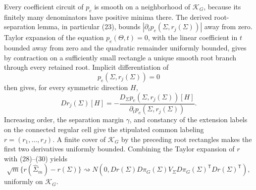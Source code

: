 Every coefficient circuit of \(p_e\) is smooth on a neighborhood of \(\mathcal K_G\), because its finitely many denominators have positive minima there.  The derived root-separation lemma, in particular (23), bounds \(|\partial_t p_e(\Sigma,r_j(\Sigma))|\) away from zero.  Taylor expansion of the equation \(p_e(\Theta,t)=0\), with the linear coefficient in \(t\) bounded away from zero and the quadratic remainder uniformly bounded, gives by contraction on a sufficiently small rectangle a unique smooth root branch through every retained root.  Implicit differentiation of
\[
 p_e(\Sigma,r_j(\Sigma))=0
\]
then gives, for every symmetric direction \(H\),
\[
 Dr_j(\Sigma)[H]
 =-\frac{D_\Sigma p_e(\Sigma,r_j(\Sigma))[H]}
         {\partial_t p_e(\Sigma,r_j(\Sigma))}.                  \tag{31}
\]
Increasing order, the separation margin \(\gamma\), and constancy of the extension labels on the connected regular cell give the stipulated common labeling \(r=(r_1,\ldots,r_J)\).  A finite cover of \(\mathcal K_G\) by the preceding root rectangles makes the first two derivatives uniformly bounded.  Combining the Taylor expansion of \(r\) with (28)--(30) yields
\[
 \sqrt m\{r(\widehat\Sigma_m)-r(\Sigma)\}
 \rightsquigarrow
 N\!\left(0,
 Dr(\Sigma)D\pi_G(\Sigma)V_\Sigma
 D\pi_G(\Sigma)^{\mathsf T}Dr(\Sigma)^{\mathsf T}
 \right),                                                       \tag{32}
\]
uniformly on \(\mathcal K_G\).

